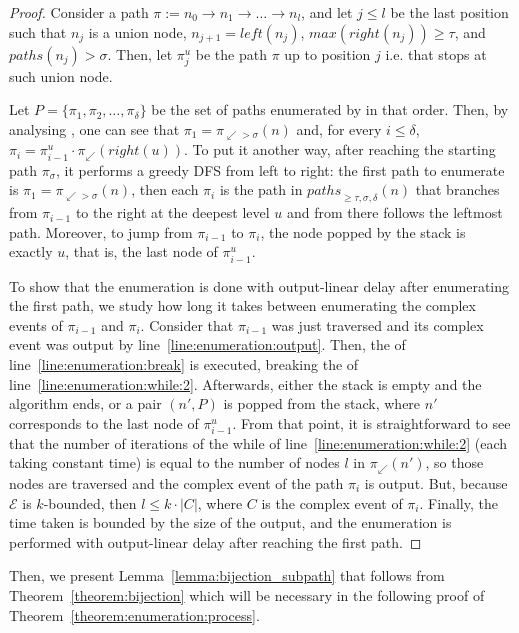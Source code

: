 \begin{proof}
  Consider a path $\pi := n_{0} \rightarrow n_{1} \rightarrow \ldots \rightarrow n_{l}$, and let $j \leq l$ be the last position such that $n_{j}$ is a union node, $n_{j+1} = left(n_{j})$, $max(right(n_{j})) \ge \tau$, and $paths(n_{j}) > \sigma$. Then, let $\pi^{u}_{j}$ be the path $\pi$ up to position $j$ i.e. that stops at such union node.

  Let $P = \{\pi_{1}, \pi_{2}, \ldots, \pi_{\delta}\}$ be the set of paths enumerated by  in that order. Then, by analysing , one can see that $\pi_{1} = \pi_{\swarrow > \sigma}(n)$ and, for every $i \le \delta$, $\pi_{i} = \pi^{u}_{i-1} \cdot \pi_{\swarrow}(right(u))$. To put it another way, after reaching the starting path $\pi_{\sigma}$, it performs a greedy DFS from left to right: the first path to enumerate is $\pi_{1} = \pi_{\swarrow > \sigma}(n)$, then each $\pi_{i}$ is the path in ${paths}_{\ge \tau, \sigma, \delta}(n)$ that branches from $\pi_{i-1}$ to the right at the deepest level $u$ and from there follows the leftmost path. Moreover, to jump from $\pi_{i-1}$ to $\pi_{i}$, the node popped by the stack is exactly $u$, that is, the last node of $\pi^{u}_{i-1}$.

  To show that the enumeration is done with output-linear delay after enumerating the first path, we study how long it takes between enumerating the complex events of $\pi_{i-1}$ and $\pi_{i}$. Consider that $\pi_{i-1}$ was just traversed and its complex event was output by line~\ref{line:enumeration:output}. Then, the  of line~\ref{line:enumeration:break} is executed, breaking the  of line~\ref{line:enumeration:while:2}. Afterwards, either the stack is empty and the algorithm ends, or a pair $(n', P)$ is popped from the stack, where $n'$ corresponds to the last node of $\pi^{u}_{i-1}$. From that point, it is straightforward to see that the number of iterations of the while of line~\ref{line:enumeration:while:2} (each taking constant time) is equal to the number of nodes $l$ in $\pi_{\swarrow}(n')$, so those nodes are traversed and the complex event of the path $\pi_{i}$ is output. But, because $\mathcal{E}$ is $k$-bounded, then $l \le k \cdot |C|$, where $C$ is the complex event of $\pi_{i}$. Finally, the time taken is bounded by the size of the output, and the enumeration is performed with output-linear delay after reaching the first path.
\end{proof}

Then, we present Lemma~\ref{lemma:bijection_subpath} that follows from Theorem~\ref{theorem:bijection} which will be necessary in the following proof of Theorem~\ref{theorem:enumeration:process}.

